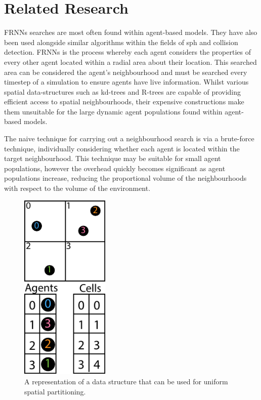 \section{Related Research\label{sec:related-work}}
\vspace{-0.5cm}
  FRNNs searches are most often found within agent-based models. They have also been used alongside similar algorithms within the fields of \gls{sph} and collision detection. FRNNs is the process whereby each agent considers the properties of every other agent located within a radial area about their location. This searched area can be considered the agent’s neighbourhood and must be searched every timestep of a simulation to ensure agents have live information. Whilst various spatial data-structures such as kd-trees and R-trees are capable of providing efficient access to spatial neighbourhoods, their expensive constructions make them unsuitable for the large dynamic agent populations found within agent-based models.

  The naive technique for carrying out a neighbourhood search is via a brute-force technique, individually considering whether each agent is located within the target neighbourhood. This technique may be suitable for small agent populations, however the overhead quickly becomes significant as agent populations increase, reducing the proportional volume of the neighbourhoods with respect to the volume of the environment.
\begin{figure}
  \begin{center}
    \includegraphics[width=0.38\textwidth]{../resources/usp/usp.pdf}
  \end{center}
  \caption{\label{fig:usp} A representation of a data structure that can be used for uniform spatial partitioning.}
\end{figure}
  
